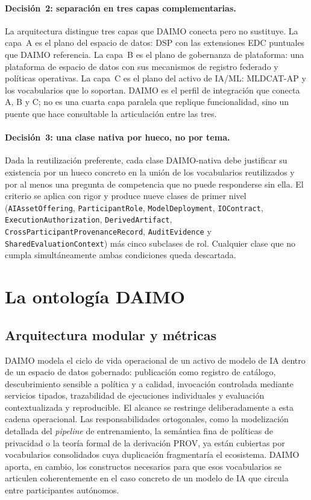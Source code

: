 \documentclass[Afour,sagev,times]{sagej}
\newcommand{\code}[1]{\texttt{#1}}
\begin{document}
\paragraph{Decisión~2: separación en tres capas complementarias.} La arquitectura distingue tres capas que DAIMO conecta pero no sustituye. La capa~A es el plano del espacio de datos: DSP con las extensiones EDC puntuales que DAIMO referencia. La capa~B es el plano de gobernanza de plataforma: una plataforma de espacio de datos con sus mecanismos de registro federado y políticas operativas. La capa~C es el plano del activo de IA/ML: MLDCAT-AP y los vocabularios que lo soportan. DAIMO es el perfil de integración que conecta A, B y C; no es una cuarta capa paralela que replique funcionalidad, sino un puente que hace consultable la articulación entre las tres.

\paragraph{Decisión~3: una clase nativa por hueco, no por tema.} Dada la reutilización preferente, cada clase DAIMO-nativa debe justificar su existencia por un hueco concreto en la unión de los vocabularios reutilizados y por al menos una pregunta de competencia que no puede responderse sin ella. El criterio se aplica con rigor y produce nueve clases de primer nivel (\code{AIAssetOffering}, \code{ParticipantRole}, \code{ModelDeployment}, \code{IOContract}, \code{ExecutionAuthorization}, \code{DerivedArtifact}, \code{CrossParticipantProvenanceRecord}, \code{AuditEvidence} y \code{SharedEvaluationContext}) más cinco subclases de rol. Cualquier clase que no cumpla simultáneamente ambas condiciones queda descartada.

\section{La ontología DAIMO}\label{sec:ontology}

\subsection{Arquitectura modular y métricas}\label{sec:scope}

DAIMO modela el ciclo de vida operacional de un activo de modelo de IA dentro de un espacio de datos gobernado: publicación como registro de catálogo, descubrimiento sensible a política y a calidad, invocación controlada mediante servicios tipados, trazabilidad de ejecuciones individuales y evaluación contextualizada y reproducible. El alcance se restringe deliberadamente a esta cadena operacional. Las responsabilidades ortogonales, como la modelización detallada del \emph{pipeline} de entrenamiento, la semántica fina de políticas de privacidad o la teoría formal de la derivación PROV, ya están cubiertas por vocabularios consolidados cuya duplicación fragmentaría el ecosistema. DAIMO aporta, en cambio, los constructos necesarios para que esos vocabularios se articulen coherentemente en el caso concreto de un modelo de IA que circula entre participantes autónomos.
\end{document}
